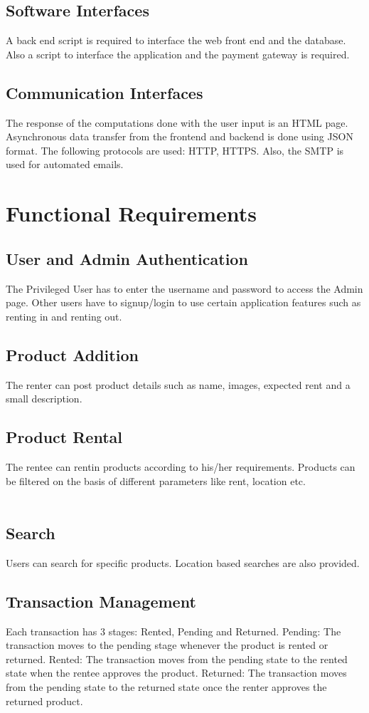 \documentclass[11pt]{report}
\begin{document}
\subsection{Software Interfaces}
A back end script is required to interface the web front end and the database. Also a script to interface the 
application and the payment gateway is required.
\subsection{Communication Interfaces}
The response of the computations done with the user input is an HTML  page. Asynchronous data transfer 
from the front­end and back­end is done using JSON format. The following protocols are used: HTTP, 
HTTPS. Also, the SMTP is used for automated e­mails.
\section{Functional Requirements}

\subsection{User and Admin Authentication}
The Privileged User has to enter the user­name and password to access the Admin page. Other users have to 
sign­up/log­in to use certain application features such as renting in and renting out.
\subsection{Product Addition}
The renter can post product details such as name, images, expected rent and a small description.
\subsection{Product Rental}
The rentee can rent­in products according to his/her requirements. Products can be filtered on the basis of 
different parameters like rent, location etc.\\\\
\subsection{Search}
Users can search for specific products. Location based searches are also provided.
\subsection{Transaction Management}
Each transaction has 3 stages: Rented, Pending and Returned.
Pending: The transaction moves to the pending stage whenever the product is rented or returned.
Rented: The transaction moves from the pending state to the rented state when the rentee approves the 
product.
Returned: The transaction moves from the pending state to the returned state once the renter approves the 
returned product.
\end{document}
